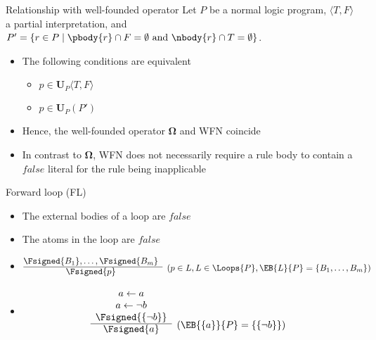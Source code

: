 \begin{frame}{Relationship with well-founded operator}
\bigskip
Let $P$ be a normal logic program,
$\langle T,F \rangle$ a partial interpretation, and\\
$P'=\{r\in P \mid \pbody{r}\cap F=\emptyset \text{ and } \nbody{r}\cap T=\emptyset\}$.\\
\bigskip
\begin{itemize}
\item <2-> The following conditions are equivalent
  \begin{itemize}\normalsize
  \item $p\in\mathbf{U}_P\langle T,F \rangle$
  \item $p\in\mathbf{U}_P(P')$
  \end{itemize}
  \medskip
\item<3-> Hence, the well-founded operator $\mathbf{\Omega}$ and WFN coincide
\item<4->  In contrast to $\mathbf{\Omega}$, WFN does not necessarily require a rule
  body to contain a $\mathit{false}$ literal for the rule being inapplicable
\end{itemize}
\end{frame}
\begin{frame}{Forward loop (FL)}
\begin{itemize}
\item {} The external bodies of a loop are $\mathit{false}$
\item {} The atoms in the loop are $\mathit{false}$
\item {}
\[
\begin{array}{@{}cl}
\Fsigned{B_1},\dots,\Fsigned{B_m} &
\raisebox{-8pt}[0pt][0pt]{($p \in L, L \in \Loops{P}, \EB{L}{P}=\{B_1,\dots,B_m\}$)}
\\\cline{1-1}
\Fsigned{p}
\end{array}
\]
\item<2-> 
\[
\begin{array}{cl}
a \leftarrow a \\
a \leftarrow \neg b \\
\Fsigned{\{\neg b\}} &
\raisebox{-8pt}[0pt][0pt]{($\EB{\{a\}}{P}=\{\{\neg b\}\}$)}
\\\cline{1-1}
\Fsigned{a}
\end{array}
\]
\end{itemize}
\end{frame}

